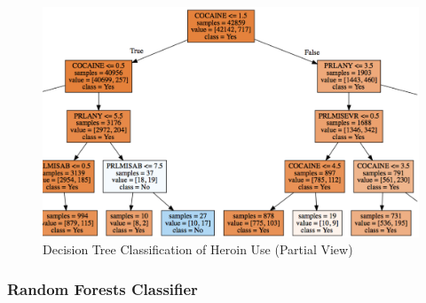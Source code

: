 \documentclass[sigconf]{acmart}
\begin{document}
\begin{figure}[!ht]
  \centering\includegraphics[width=\columnwidth]{images/Figure5.pdf}
  \caption{Decision Tree Classification of Heroin Use (Partial View)}
  \label{f:Figure5}
\end{figure}


\subsubsection{Random Forests Classifier}
\end{document}
